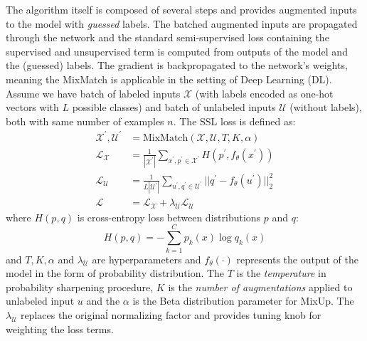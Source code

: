 The algorithm itself is composed of several steps and provides augmented inputs to the model with \textit{guessed} labels. The batched augmented inputs are propagated 
through the network and the standard semi-supervised loss containing the supervised and unsupervised term is computed from outputs of the model and the (guessed) 
labels. The gradient is backpropagated to the network's weights, meaning the MixMatch is applicable in the setting of Deep Learning (DL).
Assume we have batch of labeled inputs $\mathcal{X}$ (with labels encoded as one-hot vectors with $L$ possible classes) and batch of unlabeled inputs $\mathcal{U}$ 
(without labels), both with same number of examples $n$. The SSL loss is defined as:
\begin{align*}
    \mathcal{X}^\prime,\mathcal{U}^\prime &= \text{MixMatch}(\mathcal{X}, \mathcal{U}, T, K, \alpha)\\
    \mathcal{L}_{\mathcal{X}} &= \frac{1}{|\mathcal{X}^\prime|}\sum_{x^\prime,p^\prime \in \mathcal{X}^\prime} H(p^\prime,f_\theta(x^\prime)) \\
    \mathcal{L}_{\mathcal{U}} &= \frac{1}{L|\mathcal{U}^\prime|}\sum_{u^\prime,q^\prime \in \mathcal{U}^\prime} ||q^\prime - f_\theta(u^\prime)||_2^2 \\
    \mathcal{L} &= \mathcal{L}_{\mathcal{X}} + \lambda_\mathcal{U} \mathcal{L}_{\mathcal{U}}
\end{align*}
where $H(p,q)$ is cross-entropy loss between distributions $p$ and $q$:
\begin{equation*}
    H(p,q) = -\sum_{k=1}^{C} p_k(x) \log q_k(x)
\end{equation*}
and $T,K,\alpha$ and $\lambda_\mathcal{U}$ are hyperparameters and $f_\theta(\cdot)$ represents the 
output of the model in the form of probability distribution. The $T$ is the \textit{temperature} in probability sharpening procedure, $K$ is the \textit{number of augmentations} applied to
unlabeled input $u$ and the $\alpha$ is the Beta distribution parameter for MixUp. The $\lambda_\mathcal{U}$ replaces the originaĺ normalizing factor and provides tuning knob for 
weighting the loss terms. 

